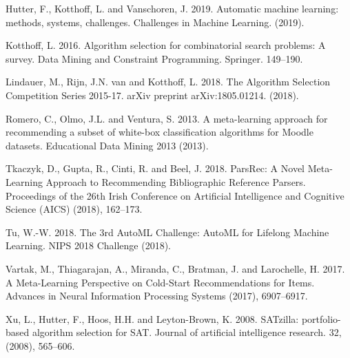 \documentclass{article}
\begin{document}
\begin{thebibliography}{9}
Hutter, F., Kotthoff, L. and Vanschoren, J. 2019. Automatic machine learning: methods, systems, challenges. Challenges in Machine Learning. (2019).

Kotthoff, L. 2016. Algorithm selection for combinatorial search problems: A survey. Data Mining and Constraint Programming. Springer. 149–190.

Lindauer, M., Rijn, J.N. van and Kotthoff, L. 2018. The Algorithm Selection Competition Series 2015-17. arXiv preprint arXiv:1805.01214. (2018).

Romero, C., Olmo, J.L. and Ventura, S. 2013. A meta-learning approach for recommending a subset of white-box classification algorithms for Moodle datasets. Educational Data Mining 2013 (2013).

Tkaczyk, D., Gupta, R., Cinti, R. and Beel, J. 2018. ParsRec: A Novel Meta-Learning Approach to Recommending Bibliographic Reference Parsers. Proceedings of the 26th Irish Conference on Artificial Intelligence and Cognitive Science (AICS) (2018), 162–173.

Tu, W.-W. 2018. The 3rd AutoML Challenge: AutoML for Lifelong Machine Learning. NIPS 2018 Challenge (2018).

Vartak, M., Thiagarajan, A., Miranda, C., Bratman, J. and Larochelle, H. 2017. A Meta-Learning Perspective on Cold-Start Recommendations for Items. Advances in Neural Information Processing Systems (2017), 6907–6917.

Xu, L., Hutter, F., Hoos, H.H. and Leyton-Brown, K. 2008. SATzilla: portfolio-based algorithm selection for SAT. Journal of artificial intelligence research. 32, (2008), 565–606.
\end{thebibliography}



\end{document}
